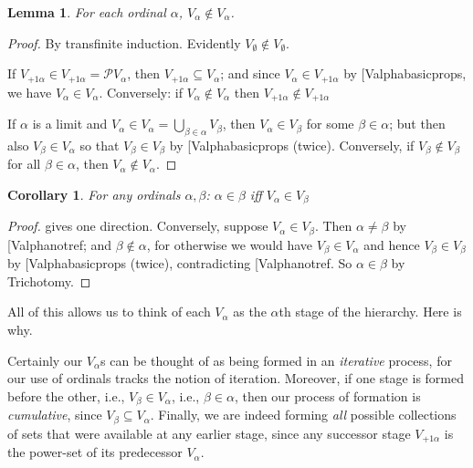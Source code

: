 \documentclass[10pt,a4paper]{article}
\makeatletter
\theoremstyle{plain}
\newtheorem{lem}[thm]{Lemma}
\newtheorem{cor}[thm]{Corollary}
\theoremstyle{definition}
\theoremstyle{remark}
\newcommand*{\ollabel}[1]{\label{#1}}
\newcommand{\olref}{\@ifnextchar[{\olref@i}{\olref@final}}
\def\olref@i[#1]{\@ifnextchar[{\olref@ii}{\olref@final}}
\def\olref@ii[#1]{\@ifnextchar[{\olref@iii}{\olref@final}}
\def\olref@iii[#1]{\olref@final}
\def\olref@final#1{\ref{#1}}
\providecommand{\ordsucc}{\mathord{+1}}
\providecommand{\Pow}{\mathcal{P}}
\makeatother
\begin{document}
\begin{lem}\ollabel{Valphanotref}
For each ordinal $\alpha$, $V_\alpha \notin V_\alpha$.
\end{lem}

\begin{proof}
By transfinite induction. Evidently $V_\emptyset \notin V_\emptyset$. 

If $V_{\ordsucc{\alpha}} \in V_{\ordsucc{\alpha}} = \Pow{V_\alpha}$,
then $V_{\ordsucc{\alpha}} \subseteq V_\alpha$; and since $V_\alpha
\in V_{\ordsucc{\alpha}}$ by \olref{Valphabasicprops}, we have
$V_\alpha \in V_\alpha$. Conversely: if $V_\alpha \notin V_\alpha$
then $V_{\ordsucc{\alpha}} \notin V_{\ordsucc{\alpha}}$

If $\alpha$ is a limit and $V_\alpha \in V_\alpha = \bigcup_{\beta \in
\alpha}V_\beta$, then $V_\alpha \in V_\beta$ for some $\beta \in
\alpha$; but then also $V_\beta \in V_\alpha$ so that $V_\beta \in
V_\beta$ by \olref{Valphabasicprops} (twice). Conversely, if $V_\beta
\notin V_\beta$ for all $\beta \in \alpha$, then $V_\alpha \notin
V_\alpha$.
\end{proof}

\begin{cor}
For any ordinals $\alpha, \beta$: $\alpha \in \beta$ iff $V_\alpha \in V_\beta$
\end{cor}

\begin{proof}
 gives one direction. Conversely, suppose $V_\alpha \in V_\beta$. Then $\alpha \neq \beta$ by \olref{Valphanotref}; and $\beta \notin \alpha$, for otherwise we would have $V_\beta \in V_\alpha$ and hence $V_\beta \in V_\beta$ by \olref{Valphabasicprops} (twice), contradicting \olref{Valphanotref}. So $\alpha \in \beta$ by Trichotomy.
\end{proof}
\noindent
All of this allows us to think of each $V_\alpha$ as the $\alpha$th
stage of the hierarchy. Here is why.

Certainly our $V_\alpha$s can be thought of as being formed in an
\emph{iterative} process, for our use of ordinals tracks the notion of
iteration. Moreover, if one stage is formed before the other, i.e.,
$V_\beta \in V_\alpha$, i.e., $\beta \in \alpha$, then our process of
formation is \emph{cumulative}, since $V_\beta \subseteq V_\alpha$.
Finally, we are indeed forming \emph{all} possible collections of sets
that were available at any earlier stage, since any successor stage
$V_{\ordsucc{\alpha}}$ is the power-set of its predecessor $V_\alpha$.
\end{document}
